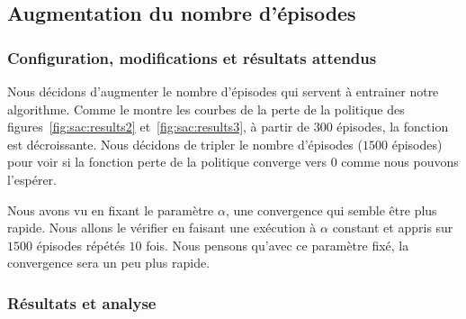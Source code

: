 \subsection{Augmentation du nombre d'épisodes}

\subsubsection{Configuration, modifications et résultats attendus}

Nous décidons d'augmenter le nombre d'épisodes qui servent à entrainer notre
algorithme. Comme le montre les courbes de la perte de la politique des
figures~\ref{fig:sac:results2} et~\ref{fig:sac:results3}, à partir de \(300\)
épisodes, la fonction est décroissante. Nous décidons de tripler le nombre
d'épisodes (\(1500\) épisodes) pour voir si la fonction perte de la politique
converge vers \(0\) comme nous pouvons l'espérer.

Nous avons vu en fixant le paramètre \(\alpha\), une convergence qui semble être
plus rapide. Nous allons le vérifier en faisant une exécution à \(\alpha\)
constant et appris sur \(1500\) épisodes répétés \(10\) fois. Nous pensons
qu'avec ce paramètre fixé, la convergence sera un peu plus rapide.

\subsubsection{Résultats et analyse}

